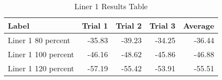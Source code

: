 \begin{table}[htbp]
\centering
\begin{tabular}{lrrrr}
\toprule
 Label & Trial 1 & Trial 2 & Trial 3 & Average \\
\midrule
 Liner 1 80 percent & -35.83 & -39.23 & -34.25 & -36.44 \\
 Liner 1 100 percent & -46.16 & -48.62 & -45.86 & -46.88 \\
 Liner 1 120 percent & -57.19 & -55.42 & -53.91 & -55.51 \\
\bottomrule
\end{tabular}
\caption{Liner 1 Results Table}
\label{fig:liner_1_results_table}
\end{table}